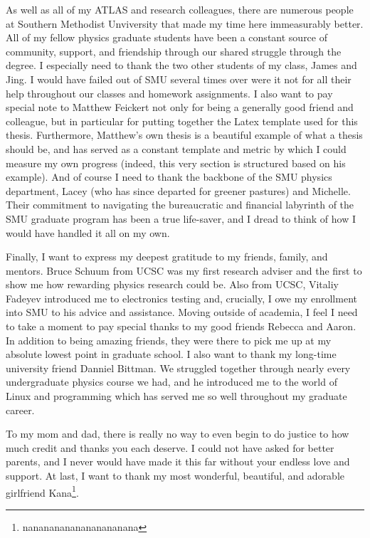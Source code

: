As well as all of my ATLAS and research colleagues,
    there are numerous people at Southern Methodist Unviversity that made my time here immeasurably better.
All of my fellow physics graduate students have been a constant source of community, support, and friendship
    through our shared struggle through the degree.
I especially need to thank the two other students of my class, James and Jing.
I would have failed out of SMU several times over were it not
    for all their help throughout our classes and homework assignments.
I also want to pay special note to Matthew Feickert not only for being a generally good friend and colleague,
    but in particular for putting together the Latex template\cite{dedman_latex_git} used for this thesis.
Furthermore, Matthew's own thesis\cite{matthew_feickert} is a beautiful example of what a thesis should be,
    and has served as a constant template and metric by which I could measure my own progress
    (indeed, this very section is structured based on his example).
And of course I need to thank the backbone of the SMU physics department, 
    Lacey (who has since departed for greener pastures) and Michelle.
Their commitment to navigating the bureaucratic and financial labyrinth of the SMU graduate program
    has been a true life-saver, and I dread to think of how I would have handled it all on my own.


Finally, I want to express my deepest gratitude to my friends, family, and mentors.
Bruce Schuum from UCSC was my first research adviser
    and the first to show me how rewarding physics research could be.
Also from UCSC, Vitaliy Fadeyev introduced me to electronics testing
    and, crucially, I owe my enrollment into SMU to his advice and assistance.
Moving outside of academia, I feel I need to take a moment to pay special thanks
    to my good friends Rebecca and Aaron.
In addition to being amazing friends, they were there to pick me up
    at my absolute lowest point in graduate school.
I also want to thank my long-time university friend Danniel Bittman.
We struggled together through nearly every undergraduate physics course we had,
    and he introduced me to the world of Linux and programming
    which has served me so well throughout my graduate career.

To my mom and dad, there is really no way to even begin to do justice
    to how much credit and thanks you each deserve.
I could not have asked for better parents,
    and I never would have made it this far without your endless love and support.
At last, I want to thank my most wonderful, beautiful, and adorable
    girlfriend Kana\footnote{nanananananananananana}.
